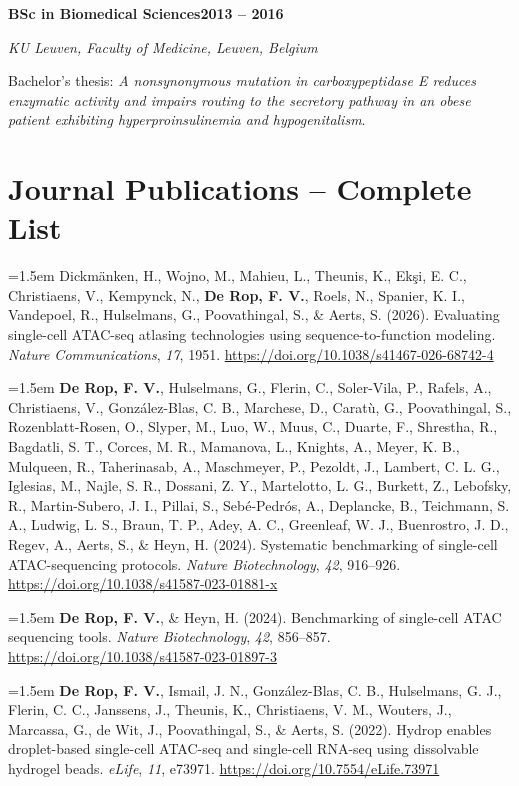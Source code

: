 \documentclass[10pt]{scrartcl}
\newcommand{\cventry}[4]{%
    \needspace{5\baselineskip}%
    {\large\textbf{#1}}\hfill\textbf{#3}\par
    \textit{#2}\par
    \smallskip
    #4\par
    \medskip
}
\newcommand{\cvpublication}[1]{%
    \par\noindent\hangindent=1.5em\hangafter=1 #1\par\smallskip
}
\begin{document}
\cventry
    {BSc in Biomedical Sciences}
    {KU Leuven, Faculty of Medicine, Leuven, Belgium}
    {2013 -- 2016}
    {Bachelor's thesis: \emph{A nonsynonymous mutation in carboxypeptidase E reduces enzymatic activity and impairs routing to the secretory pathway in an obese patient exhibiting hyperproinsulinemia and hypogenitalism}.}

\section{Journal Publications -- Complete List}

{\small

\cvpublication{Dickm\"anken, H., Wojno, M., Mahieu, L., Theunis, K., Ek\c{s}i, E. C., Christiaens, V., Kempynck, N., \textbf{De Rop, F. V.}, Roels, N., Spanier, K. I., Vandepoel, R., Hulselmans, G., Poovathingal, S., \& Aerts, S. (2026). Evaluating single-cell ATAC-seq atlasing technologies using sequence-to-function modeling. \emph{Nature Communications}, \emph{17}, 1951. \href{https://doi.org/10.1038/s41467-026-68742-4}{https://doi.org/10.1038/s41467-026-68742-4}}

\cvpublication{\textbf{De Rop, F. V.}, Hulselmans, G., Flerin, C., Soler-Vila, P., Rafels, A., Christiaens, V., Gonz\'alez-Blas, C. B., Marchese, D., Carat\`u, G., Poovathingal, S., Rozenblatt-Rosen, O., Slyper, M., Luo, W., Muus, C., Duarte, F., Shrestha, R., Bagdatli, S. T., Corces, M. R., Mamanova, L., Knights, A., Meyer, K. B., Mulqueen, R., Taherinasab, A., Maschmeyer, P., Pezoldt, J., Lambert, C. L. G., Iglesias, M., Najle, S. R., Dossani, Z. Y., Martelotto, L. G., Burkett, Z., Lebofsky, R., Martin-Subero, J. I., Pillai, S., Seb\'e-Pedr\'os, A., Deplancke, B., Teichmann, S. A., Ludwig, L. S., Braun, T. P., Adey, A. C., Greenleaf, W. J., Buenrostro, J. D., Regev, A., Aerts, S., \& Heyn, H. (2024). Systematic benchmarking of single-cell ATAC-sequencing protocols. \emph{Nature Biotechnology}, \emph{42}, 916--926. \href{https://doi.org/10.1038/s41587-023-01881-x}{https://doi.org/10.1038/s41587-023-01881-x}}

\cvpublication{\textbf{De Rop, F. V.}, \& Heyn, H. (2024). Benchmarking of single-cell ATAC sequencing tools. \emph{Nature Biotechnology}, \emph{42}, 856--857. \href{https://doi.org/10.1038/s41587-023-01897-3}{https://doi.org/10.1038/s41587-023-01897-3}}

\cvpublication{\textbf{De Rop, F. V.}, Ismail, J. N., Gonz\'alez-Blas, C. B., Hulselmans, G. J., Flerin, C. C., Janssens, J., Theunis, K., Christiaens, V. M., Wouters, J., Marcassa, G., de Wit, J., Poovathingal, S., \& Aerts, S. (2022). Hydrop enables droplet-based single-cell ATAC-seq and single-cell RNA-seq using dissolvable hydrogel beads. \emph{eLife}, \emph{11}, e73971. \href{https://doi.org/10.7554/eLife.73971}{https://doi.org/10.7554/eLife.73971}}

}
\end{document}
